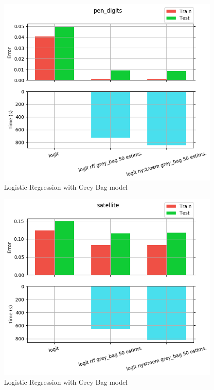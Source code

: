 \begin{figure}[th]
\centering
\includegraphics[scale=\imgscale]{Figures/2_3/pen_digits}
\decoRule
\caption[2.3 pen\tu digits]{Logistic Regression with Grey Bag model}
\label{fig:2_3_pen_digits}
\end{figure}

\begin{figure}[th]
\centering
\includegraphics[scale=\imgscale]{Figures/2_3/satellite}
\decoRule
\caption[2.3 satellite]{Logistic Regression with Grey Bag model}
\label{fig:2_3_satellite}
\end{figure}

